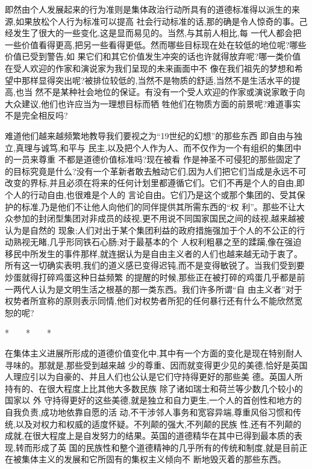 ﻿\documentclass[12pt]{article}
\begin{document}
即然由个人发展起来的行为准则是集体政治行动所具有的道德标准得以派生的来源,如果放松个人行为标准可以提高
社会行动标准的话,那的确是令人惊奇的事。己经发生了很大的一些变化,这是显而易见的。当然,与其前人相比,每
一代人都会把一些价值看得更高,把另一些看得更低。然而哪些目标现在处在较低的地位呢?哪些价值已受到警告,如
果它们和其它价值发生冲突的话也许就得放弃呢?哪一类价值在受人欢迎的作家和演说家为我们呈现的未来画面中不
像在我们祖先的梦想和希望中那样显得突出呢?被排位较低的,当然不是物质的舒适,当然不是生活水平的提高,也当
然不是某种社会地位的保证。有没有一个受人欢迎的作家或演说家敢于向大众建议,他们也许应当为一理想目标而牺
牲他们在物质方面的前景呢?难道事实不是完全相反吗?

难道他们越来越频繁地教导我们要视之为``19世纪的幻想''的那些东西 \myrule 即自由与独立,真理与诚笃,和平与
民主,以及把个人作为人、而不仅作为一个有组织的集团中的一员来尊重 \myrule 不都是道德价值标准吗?现在被看
作是神圣不可侵犯的那些固定了的目标究竟是什么?没有一个革新者敢去触动它们,因为人们把它们当成是永远不可
改变的界标,并且必须在将来的任何计划里都遵循它们。它们不再是个人的自由,即个人的行动自由,也很难是个人的
言论自由。它们乃是这个或那个集团的、受其保护的标准,乃是他们不让他人向他们的同伴提供其所需东西的``权
利''。那些不让大众参加的封闭型集团对非成员的歧视,更不用说不同国家国民之间的歧视,越来越被认为是自然的
现象;人们对出于某个集团利益的政府措施强加于个人的不公正的行动熟视无睹,几乎形同铁石心肠;对于最基本的个
人权利粗暴之至的蹂躏,像在强迫移民中所发生的事件那样,就连据认为是自由主义者的人们也越来越无动于衷了。
所有这一切确实表明,我们的道义感已变得迟钝,而不是变得敏锐了。当我们受到要炒蛋就得打碎鸡蛋这种日益频繁
的提醒的时候,那些正在被打碎的鸡蛋几乎都是前一两代人认为是文明生活之根基的那一类东西。我们许多所谓``自
由主义者''对于权势者所宣称的原则表示同情,他们对权势者所犯的任何暴行还有什么不能欣然宽恕的呢?

*　　*　　*

在集体主义进展所形成的道德价值变化中,其中有一个方面的变化是现在特别耐人寻味的。那就是,那些受到越来越
少的尊重、因而就变得更少见的美德,恰好是英国人理应引以为自豪的、并且人们也公认是它们守持得更好的那些美
德。英国人所持有的、在很大程度上比其他大多数民族 \myrule 除了诸如瑞士和荷兰等少数几个较小的国家以
外 \myrule 守持得更好的这些美德,就是独立和自力更生,一个人的首创性和地方的自我负责,成功地依靠自愿的活
动,不干涉邻人事务和宽容异端,尊重风俗习惯和传统,以及对权力和权威的适度怀疑。不列颠的强大,不列颠的民族
性,还有不列颠的成就,在很大程度上是自发努力的结果。英国的道德精华在其中已得到最本质的表现,转而形成了英
国的民族性和整个道德精神的几乎所有的传统和制度,就是目前正在被集体主义的发展和它所固有的集权主义倾向不
断地毁灭着的那些东西。
\end{document}
